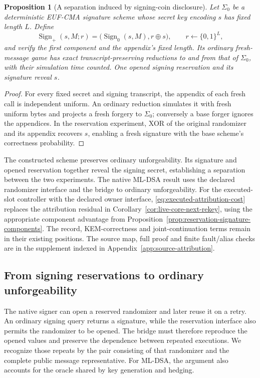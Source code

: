 \documentclass[pdflatex]{sn-jnl}
\theoremstyle{thmstyleone}
\newtheorem{proposition}[theorem]{Proposition}
\theoremstyle{thmstylethree}
\theoremstyle{thmstyletwo}
\begin{document}
\begin{proposition}[A separation induced by signing-coin disclosure]
\label{prop:signature-coin-separation}
Let $\Sigma_0$ be a deterministic EUF-CMA signature scheme whose secret
key encoding $s$ has fixed length $L$. Define
\[
 \operatorname{Sign}_{+}(s,M;r)
   =\bigl(\operatorname{Sign}_0(s,M),r\oplus s\bigr),
 \qquad r\leftarrow\{0,1\}^{L},
\]
and verify the first component and the appendix's fixed length.
Its ordinary fresh-message game has exact transcript-preserving
reductions to and from that of $\Sigma_0$, with their simulation time counted.
One opened signing reservation and its signature reveal $s$.
\end{proposition}
\begin{proof}
For every fixed secret and signing transcript, the appendix of each
fresh call is independent uniform. An ordinary reduction simulates it
with fresh uniform bytes and projects a fresh forgery to $\Sigma_0$;
conversely a base forger ignores the appendices. In the reservation
experiment, XOR of the original randomizer and its appendix recovers
$s$, enabling a fresh signature with the base scheme's correctness
probability.
\end{proof}

The constructed scheme preserves ordinary unforgeability. Its signature
and opened reservation together reveal the signing secret, establishing
a separation between the two experiments. The native ML-DSA result uses
the declared randomizer interface and the bridge to ordinary unforgeability.
For the executed-slot controller with the declared owner interface,
\eqref{eq:executed-attribution-cost} replaces the attribution residual
in Corollary~\ref{cor:live-core-next-rekey}, using the appropriate component
advantage from Proposition~\ref{prop:reservation-signature-components}.
The record, KEM-correctness and joint-continuation terms remain in their
existing positions. The source map, full proof and finite fault/alias
checks are in the supplement indexed in Appendix~\ref{app:source-attribution}.
\subsection{From signing reservations to ordinary unforgeability}
\label{sec:reservation-ordinary-bridge}

The native signer can open a reserved randomizer and later reuse it on
a retry. An ordinary signing query returns a signature, while the
reservation interface also permits the randomizer to be opened. The
bridge must therefore reproduce the opened values and preserve the
dependence between repeated executions. We recognize those repeats by
the pair consisting of that randomizer and the complete public
message representative. For ML-DSA, the argument also accounts for the
oracle shared by key generation and hedging.
\end{document}
